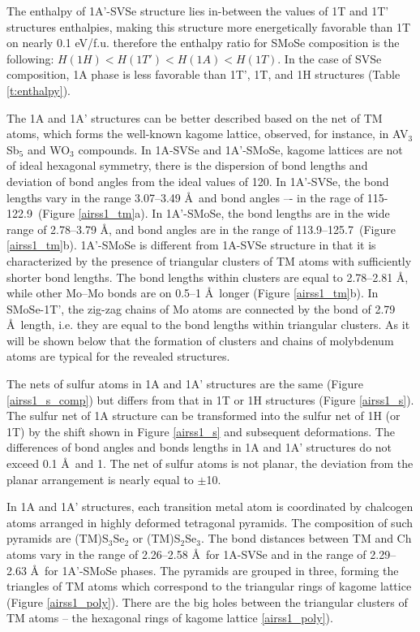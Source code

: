 \documentclass[a4paperm]{article}
\begin{document}
The enthalpy of 1A'-SVSe structure lies in-between the values of 1T and 1T' structures enthalpies, making this structure more energetically favorable than 1T on nearly 0.1 eV/f.u. therefore the enthalpy ratio for SMoSe composition is the following: 
$H(1H) < H(1T') < H(1A) < H (1T)$.
In the case of SVSe composition, 1A phase is less favorable than 1T', 1T, and 1H structures (Table \ref{t:enthalpy}).


The 1A and 1A' structures can be better described based on the net of TM atoms, which forms the well-known kagome lattice\cite{zhang2021_kagome}, observed, for instance, in AV$_3$Sb$_5$ \cite{ortiz2021} and WO$_3$ \cite{gerand1979} compounds.
In 1A-SVSe and 1A'-SMoSe, kagome lattices are not of ideal hexagonal symmetry, there is the dispersion of bond lengths and deviation of bond angles from the ideal values of 120\textdegree.
In 1A'-SVSe, the bond lengths vary in the range 3.07--3.49 \AA\ and bond angles –- in the rage of 115-122.9\textdegree\ (Figure \ref{airss1_tm}a).
In 1A'-SMoSe, the bond lengths are in the wide range of 2.78--3.79 \AA, and bond angles are in the range of 113.9--125.7\textdegree\ (Figure \ref{airss1_tm}b).
1A'-SMoSe is different from 1A-SVSe structure in that it is characterized by the presence of triangular clusters of TM atoms with sufficiently shorter bond lengths.
The bond lengths within clusters are equal to 2.78--2.81 \AA, while other Mo--Mo bonds are on 0.5--1 \AA\ longer (Figure \ref{airss1_tm}b).
In SMoSe-1T', the zig-zag chains of Mo atoms are connected by the bond of 2.79 \AA\ length, i.e. they are equal to the bond lengths within triangular clusters.
As it will be shown below that the formation of clusters and chains of molybdenum atoms are typical for the revealed structures.

The nets of sulfur atoms in 1A and 1A' structures are the same (Figure \ref{airss1_s_comp}) but differs from that in 1T or 1H structures (Figure \ref{airss1_s}).
The sulfur net of 1A structure can be transformed into the sulfur net of 1H (or 1T) by the shift shown in Figure \ref{airss1_s} and subsequent deformations.
The differences of bond angles and bonds lengths in 1A and 1A' structures do not exceed 0.1 \AA\ and 1\textdegree.
The net of sulfur atoms is not planar, the deviation from the planar arrangement is nearly equal to $\pm$10\textdegree.

In 1A and 1A' structures, each transition metal atom is coordinated by chalcogen atoms arranged in highly deformed tetragonal pyramids.
The composition of such pyramids are (TM)S$_3$Se$_2$ or (TM)S$_2$Se$_3$.
The bond distances between TM and Ch atoms vary in the range of 2.26--2.58 \AA\ for 1A-SVSe and in the range of 2.29--2.63 \AA\ for 1A'-SMoSe phases. The pyramids are grouped in three, forming the triangles of TM atoms which correspond to the triangular rings of kagome lattice (Figure \ref{airss1_poly}).
There are the big holes between the triangular clusters of TM atoms -- the hexagonal rings of kagome lattice \ref{airss1_poly}).
\end{document}
